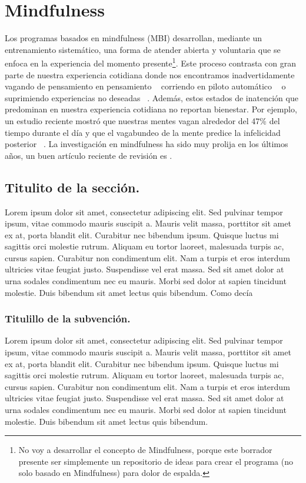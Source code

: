 \onehalfspacing
\chapter{Mindfulness}
Los programas basados en mindfulness (MBI) desarrollan, mediante un entrenamiento sistemático, una forma de atender abierta y voluntaria que se enfoca en la experiencia del momento presente\footnote{No voy a desarrollar el concepto de Mindfulness, porque este borrador presente ser simplemente un repositorio de ideas para crear el programa (no solo basado en Mindfulness) para dolor de espalda.}. Este proceso contrasta con gran parte de nuestra experiencia cotidiana donde nos encontramos inadvertidamente vagando de pensamiento en pensamiento ~\citep{Killingsworth:2010ej} corriendo en piloto automático ~\citep{Bargh:1999gt} o suprimiendo experiencias no deseadas ~\citep{Kang:2013gl}. Además, estos estados de inatención que predominan en nuestra experiencia cotidiana no reportan bienestar. Por ejemplo, un estudio reciente mostró que nuestras mentes vagan alrededor del 47\% del tiempo durante el día y que el vagabundeo de la mente predice la infelicidad posterior ~\citep{Killingsworth:2010ej}. La investigación en mindfulness ha sido muy prolija en los últimos años, un buen artículo reciente de revisión es  \citet{Creswell:2017bka}.
\section{Titulito de la sección.}
Lorem ipsum dolor sit amet, consectetur adipiscing elit. Sed pulvinar tempor ipsum, vitae commodo mauris suscipit a. Mauris velit massa, porttitor sit amet ex at, porta blandit elit. Curabitur nec bibendum ipsum. Quisque luctus mi sagittis orci molestie rutrum. Aliquam eu tortor laoreet, malesuada turpis ac, cursus sapien. Curabitur non condimentum elit. Nam a turpis et eros interdum ultricies vitae feugiat justo. Suspendisse vel erat massa. Sed sit amet dolor at urna sodales condimentum nec eu mauris. Morbi sed dolor at sapien tincidunt molestie. Duis bibendum sit amet lectus quis bibendum.
Como decía \citep{Jeng:2010hj}

\subsection{Titulillo de la subvención.}
Lorem ipsum dolor sit amet, consectetur adipiscing elit. Sed pulvinar tempor ipsum, vitae commodo mauris suscipit a. Mauris velit massa, porttitor sit amet ex at, porta blandit elit. Curabitur nec bibendum ipsum. Quisque luctus mi sagittis orci molestie rutrum. Aliquam eu tortor laoreet, malesuada turpis ac, cursus sapien. Curabitur non condimentum elit. Nam a turpis et eros interdum ultricies vitae feugiat justo. Suspendisse vel erat massa. Sed sit amet dolor at urna sodales condimentum nec eu mauris. Morbi sed dolor at sapien tincidunt molestie. Duis bibendum sit amet lectus quis bibendum.

